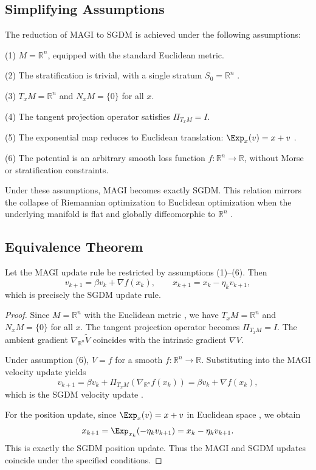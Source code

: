 \documentclass[12pt]{article}
\begin{document}
\subsection*{Simplifying Assumptions}

The reduction of MAGI to SGDM is achieved under the following assumptions:

(1) $M = \mathbb{R}^n$, equipped with the standard Euclidean metric.

(2) The stratification is trivial, with a single stratum $S_0 = \mathbb{R}^n$ \citep{GuilleminPollack1974}.

(3) $T_xM = \mathbb{R}^n$ and $N_xM = \{0\}$ for all $x$.

(4) The tangent projection operator satisfies $\Pi_{T_xM}=I$.

(5) The exponential map reduces to Euclidean translation: $\Exp_x(v)=x+v$ \citep{LeeSmooth2013}.

(6) The potential is an arbitrary smooth loss function $f : \mathbb{R}^n \to \mathbb{R}$, without Morse or stratification constraints.

Under these assumptions, MAGI becomes exactly SGDM. This relation mirrors the collapse of Riemannian optimization to Euclidean optimization when the underlying manifold is flat and globally diffeomorphic to $\mathbb{R}^n$ \citep{Absil2008,Boumal2023}.

\subsection*{Equivalence Theorem}

\begin{theorem}
Let the MAGI update rule be restricted by assumptions (1)--(6). Then
\[
v_{k+1} = \beta v_k + \nabla f(x_k),
\qquad
x_{k+1} = x_k - \eta_k v_{k+1},
\]
which is precisely the SGDM update rule.
\end{theorem}

\begin{proof}
Since $M=\mathbb{R}^n$ with the Euclidean metric \citep{LeeSmooth2013}, we have $T_xM=\mathbb{R}^n$ and $N_xM=\{0\}$ for all $x$. The tangent projection operator becomes $\Pi_{T_xM}=I$. The ambient gradient $\nabla_{\mathbb{R}^n}\widetilde{V}$ coincides with the intrinsic gradient $\nabla V$.

Under assumption (6), $V=f$ for a smooth $f : \mathbb{R}^n \to \mathbb{R}$. Substituting into the MAGI velocity update yields
\[
v_{k+1} = \beta v_k + \Pi_{T_xM}(\nabla_{\mathbb{R}^n} f(x_k)) 
= \beta v_k + \nabla f(x_k),
\]
which is the SGDM velocity update \citep{Polyak1964,Sutskever2013}.

For the position update, since $\Exp_{x}(v) = x + v$ in Euclidean space \citep{LeeRiemannian2018}, we obtain
\[
x_{k+1}
=
\Exp_{x_k}(-\eta_k v_{k+1})
=
x_k - \eta_k v_{k+1}.
\]
This is exactly the SGDM position update. Thus the MAGI and SGDM updates coincide under the specified conditions.
\end{proof}
\end{document}
